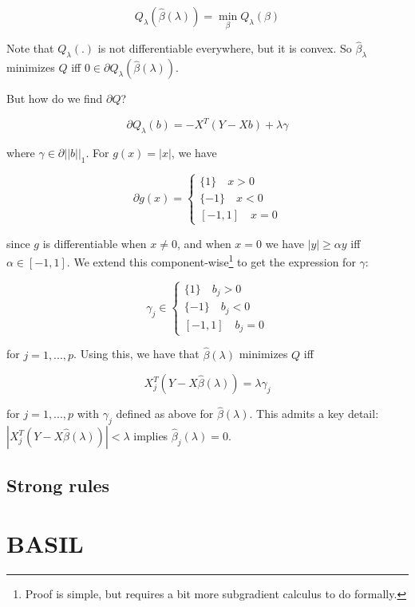 \documentclass{amsart}
\begin{document}
$$Q_\lambda(\hat{\beta}(\lambda)) = \min_{\beta}Q_{\lambda}(\beta)$$

Note that $Q_{\lambda}(.)$ is not differentiable everywhere, but it is convex.
So $\hat{\beta}_{\lambda}$ minimizes $Q$ iff $0 \in \partial
Q_{\lambda}(\hat{\beta}(\lambda))$. 

\bigskip

But how do we find $\partial Q$?

$$\partial Q_{\lambda}(b) = -X^T(Y - Xb) + \lambda \gamma$$

where $\gamma \in \partial ||b||_1$. For $g(x) = |x|$, we have 

$$\partial g (x) = \begin{cases}
	\{ 1 \} \quad x > 0 \\
	\{ -1 \} \quad x < 0 \\
	[-1,1] \quad x = 0
\end{cases}$$

since $g$ is differentiable when $x \neq 0$, and when $x = 0$ we have $|y| \geq
\alpha y$ iff $\alpha \in [-1,1]$. We extend this component-wise\footnote{Proof
is simple, but requires a bit more subgradient calculus to do formally.} to get the
expression for $\gamma$:

$$\gamma_j \in \begin{cases}
	\{ 1 \} \quad b_j > 0 \\
	\{ -1 \} \quad b_j < 0 \\
	[-1,1] \quad b_j = 0
\end{cases}$$

for $j = 1, ..., p$. Using this, we have that $\hat{\beta}(\lambda)$ minimizes
$Q$ iff 

$$X^T_j(Y - X\hat{\beta}(\lambda)) = \lambda \gamma_j$$

for $j = 1, ..., p$ with $\gamma_j$ defined as above for $\hat{\beta}(\lambda)$.
This admits a key detail: $|X^T_j(Y - X\hat{\beta}(\lambda))| < \lambda$ implies
$\hat{\beta}_j(\lambda) = 0$.



\subsection{Strong rules}

\section{BASIL}




\end{document}
